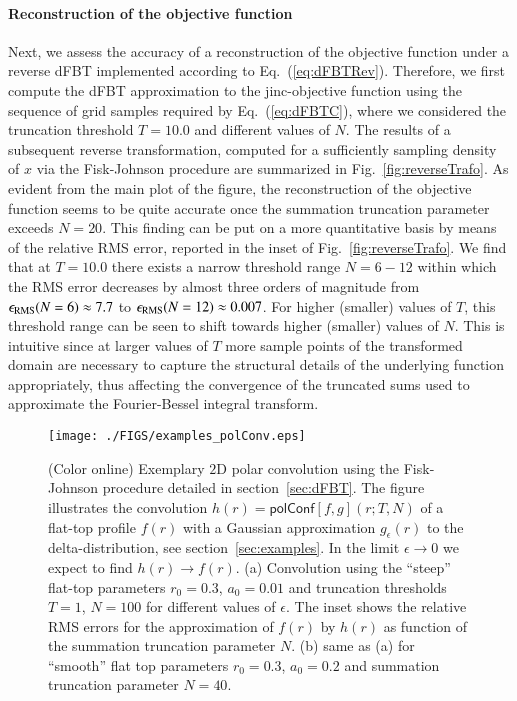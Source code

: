 \documentclass[review]{elsarticle}
\begin{document}
\paragraph{Reconstruction of the objective function}
Next, we assess the accuracy of a reconstruction of the objective function
under a reverse dFBT implemented according to Eq.~(\ref{eq:dFBTRev}).
Therefore, we first compute the dFBT approximation to the {\rm jinc}-objective
function using the sequence of grid samples required by Eq.~(\ref{eq:dFBTC}),
where we considered the truncation threshold $T=10.0$ and different values of
$N$. The results of a subsequent reverse transformation, computed for a
sufficiently sampling density of $x$ via the Fisk-Johnson procedure are
summarized in Fig.~\ref{fig:reverseTrafo}.  As evident from the main plot of
the figure, the reconstruction of the objective function seems to be quite
accurate once the summation truncation parameter exceeds $N=20$. This finding
can be put on a more quantitative basis by means of the relative RMS error,
reported in the inset of Fig.~\ref{fig:reverseTrafo}. We find that at $T=10.0$
there exists a narrow threshold range $N=6-12$ within which the RMS error
decreases by almost three orders of magnitude from $\epsilon_{\rm
RMS}(N=6)\approx 7.7$ to $\epsilon_{\rm RMS}(N=12)\approx 0.007$. For higher
(smaller) values of $T$, this threshold range can be seen to shift towards
higher (smaller) values of $N$.  This is intuitive since at larger values of
$T$ more sample points of the transformed domain are necessary to capture the
structural details of the underlying function appropriately, thus affecting the
convergence of the truncated sums used to approximate the Fourier-Bessel
integral transform. 

%
%
\begin{figure}[t!]
\centerline{\texttt{[image: ./FIGS/examples\_polConv.eps]} } 
\caption{(Color online) Exemplary $2$D polar convolution using the Fisk-Johnson
procedure detailed in section~\ref{sec:dFBT}. The figure illustrates the 
convolution $h(r) = {\mathsf{polConf}}[f,g](r;T,N)$ of a flat-top profile $f(r)$ with 
a Gaussian approximation $g_\epsilon(r)$ to the delta-distribution, see 
section~\ref{sec:examples}.
In the limit $\epsilon \to 0$ we expect to find $h(r)\to f(r)$.
(a) Convolution using the ``steep'' flat-top parameters $r_0=0.3$, $a_0=0.01$ and truncation
thresholds $T=1$, $N=100$ for different values of $\epsilon$. The inset shows
the relative RMS errors for the approximation of $f(r)$ by $h(r)$ as function 
of the summation truncation parameter $N$. 
(b) same as (a) for ``smooth'' flat top parameters $r_0=0.3$, $a_0=0.2$ and
summation truncation parameter $N=40$. 
}
\label{fig:polConv}
\end{figure}
\end{document}

